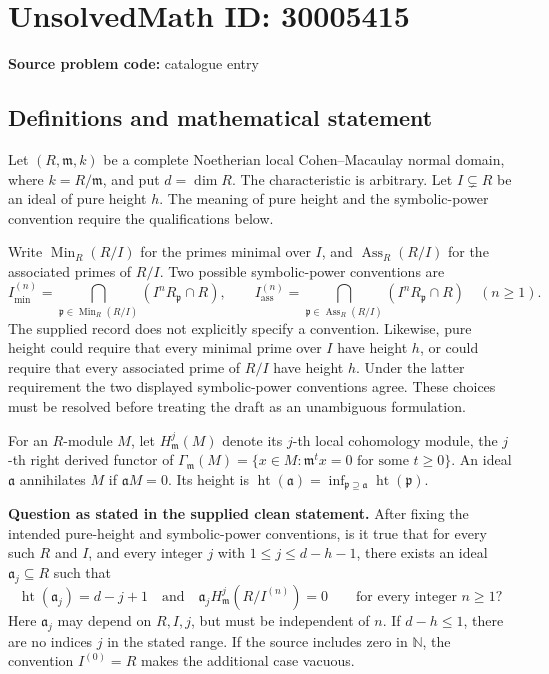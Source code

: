 \documentclass[11pt]{article}
\newcommand{\N}{\mathbb{N}}
\begin{document}
\section*{UnsolvedMath ID: 30005415}
\textbf{Source problem code:} catalogue entry
\subsection{Definitions and mathematical statement}
Let \((R,\mathfrak m,k)\) be a complete Noetherian local Cohen--Macaulay normal domain, where \(k=R/\mathfrak m\), and put \(d=\dim R\). The characteristic is arbitrary. Let \(I\subsetneq R\) be an ideal of pure height \(h\). The meaning of pure height and the symbolic-power convention require the qualifications below.

Write \(\operatorname{Min}_R(R/I)\) for the primes minimal over \(I\), and \(\operatorname{Ass}_R(R/I)\) for the associated primes of \(R/I\). Two possible symbolic-power conventions are
\[
 I^{(n)}_{\min}=\bigcap_{\mathfrak p\in\operatorname{Min}_R(R/I)}(I^nR_{\mathfrak p}\cap R),\qquad
 I^{(n)}_{\mathrm{ass}}=\bigcap_{\mathfrak p\in\operatorname{Ass}_R(R/I)}(I^nR_{\mathfrak p}\cap R)
 \quad(n\geq1).
\]
The supplied record does not explicitly specify a convention. Likewise, pure height could require that every minimal prime over \(I\) have height \(h\), or could require that every associated prime of \(R/I\) have height \(h\). Under the latter requirement the two displayed symbolic-power conventions agree. These choices must be resolved before treating the draft as an unambiguous formulation.

For an \(R\)-module \(M\), let \(H^j_{\mathfrak m}(M)\) denote its \(j\)-th local cohomology module, the \(j\)-th right derived functor of \(\Gamma_{\mathfrak m}(M)=\{x\in M:\mathfrak m^t x=0\text{ for some }t\geq0\}\). An ideal \(\mathfrak a\) annihilates \(M\) if \(\mathfrak aM=0\). Its height is \(\operatorname{ht}(\mathfrak a)=\inf_{\mathfrak p\supseteq\mathfrak a}\operatorname{ht}(\mathfrak p)\).

\textbf{Question as stated in the supplied clean statement.} After fixing the intended pure-height and symbolic-power conventions, is it true that for every such \(R\) and \(I\), and every integer \(j\) with \(1\leq j\leq d-h-1\), there exists an ideal \(\mathfrak a_j\subseteq R\) such that
\[
 \operatorname{ht}(\mathfrak a_j)=d-j+1
 \quad\text{and}\quad
 \mathfrak a_j H^j_{\mathfrak m}(R/I^{(n)})=0
 \qquad\text{for every integer }n\geq1?
\]
Here \(\mathfrak a_j\) may depend on \(R,I,j\), but must be independent of \(n\). If \(d-h\leq1\), there are no indices \(j\) in the stated range. If the source includes zero in \(\N\), the convention \(I^{(0)}=R\) makes the additional case vacuous.
\end{document}
